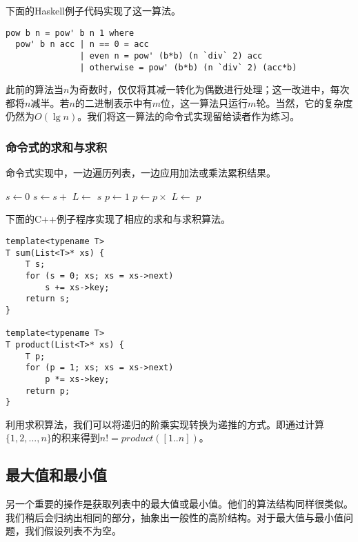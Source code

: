 \documentclass[UTF8]{article}
\begin{document}
下面的Haskell例子代码实现了这一算法。

\lstset{language=Haskell}
\begin{lstlisting}[style=Haskell]
pow b n = pow' b n 1 where
  pow' b n acc | n == 0 = acc
               | even n = pow' (b*b) (n `div` 2) acc
               | otherwise = pow' (b*b) (n `div` 2) (acc*b)
\end{lstlisting}

此前的算法当$n$为奇数时，仅仅将其减一转化为偶数进行处理；这一改进中，每次都将$n$减半。若$n$的二进制表示中有$m$位，这一算法只运行$m$轮。当然，它的复杂度仍然为$O(\lg n)$。我们将这一算法的命令式实现留给读者作为练习。

\subsubsection{命令式的求和与求积}
命令式实现中，一边遍历列表，一边应用加法或乘法累积结果。

\begin{algorithmic}[1]
  \State $s \gets 0$
    \State $s \gets s +$ 
    \State $L \gets$ 
  \EndWhile
  \State \Return $s$
\EndFunction
\Statex
{}
  \State $p \gets 1$
    \State $p \gets p \times $ 
    \State $L \gets$ 
  \EndWhile
  \State \Return $p$
\EndFunction
\end{algorithmic}

下面的C++例子程序实现了相应的求和与求积算法。

\lstset{language=C++}
\begin{lstlisting}
template<typename T>
T sum(List<T>* xs) {
    T s;
    for (s = 0; xs; xs = xs->next)
        s += xs->key;
    return s;
}

template<typename T>
T product(List<T>* xs) {
    T p;
    for (p = 1; xs; xs = xs->next)
        p *= xs->key;
    return p;
}
\end{lstlisting}

利用求积算法，我们可以将递归的阶乘实现转换为递推的方式。即通过计算$\{1, 2, ..., n\}$的积来得到$n! = product([1..n])$。

\subsection{最大值和最小值}

另一个重要的操作是获取列表中的最大值或最小值。他们的算法结构同样很类似。我们稍后会归纳出相同的部分，抽象出一般性的高阶结构。对于最大值与最小值问题，我们假设列表不为空。
\end{document}
